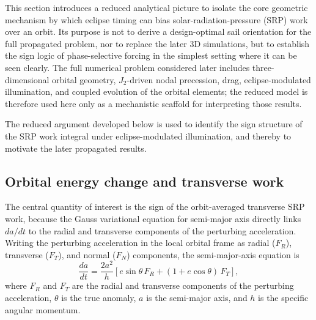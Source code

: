 \FloatBarrier
\noindent This section introduces a reduced analytical picture to isolate the core geometric mechanism by which eclipse timing can bias solar-radiation-pressure (SRP) work over an orbit. Its purpose is not to derive a design-optimal sail orientation for the full propagated problem, nor to replace the later 3D simulations, but to establish the sign logic of phase-selective forcing in the simplest setting where it can be seen clearly. The full numerical problem considered later includes three-dimensional orbital geometry, \(J_2\)-driven nodal precession, drag, eclipse-modulated illumination, and coupled evolution of the orbital elements; the reduced model is therefore used here only as a mechanistic scaffold for interpreting those results.

\vspace{-0.5em}
\par\noindent The reduced argument developed below is used to identify the sign structure of the SRP work integral under eclipse-modulated illumination, and thereby to motivate the later propagated results.

\vspace{0.5em}
\subsection{\textbf{Orbital energy change and transverse work}}

\noindent The central quantity of interest is the sign of the orbit-averaged transverse SRP work, because the Gauss variational equation for semi-major axis \citep{vallado2007,battin1999} directly links \(da/dt\) to the radial and transverse components of the perturbing acceleration. Writing the perturbing acceleration in the local orbital frame as radial (\(F_R\)), transverse (\(F_T\)), and normal (\(F_N\)) components, the semi-major-axis equation is
\begin{equation}
\frac{da}{dt} = \frac{2a^2}{h}\left[e\sin\theta\,F_R + (1+e\cos\theta)\,F_T\right],
\label{eq:da_gve}
\end{equation}
where $F_R$ and $F_T$ are the radial and transverse components of the perturbing acceleration, $\theta$ is the true anomaly, $a$ is the semi-major axis, and $h$ is the specific angular momentum.

